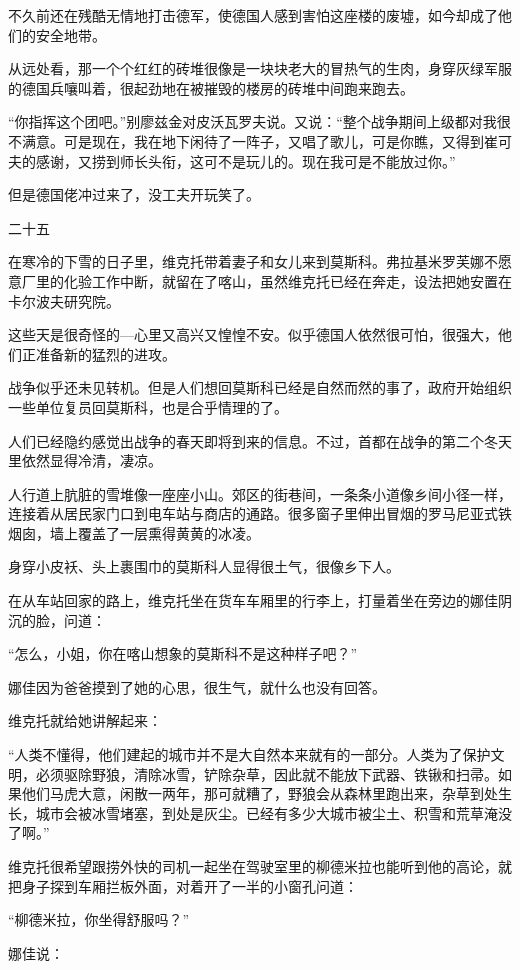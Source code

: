 不久前还在残酷无情地打击德军，使德国人感到害怕这座楼的废墟，如今却成了他们的安全地带。

从远处看，那一个个红红的砖堆很像是一块块老大的冒热气的生肉，身穿灰绿军服的德国兵嚷叫着，很起劲地在被摧毁的楼房的砖堆中间跑来跑去。

“你指挥这个团吧。”别廖兹金对皮沃瓦罗夫说。又说：“整个战争期间上级都对我很不满意。可是现在，我在地下闲待了一阵子，又唱了歌儿，可是你瞧，又得到崔可夫的感谢，又捞到师长头衔，这可不是玩儿的。现在我可是不能放过你。”

但是德国佬冲过来了，没工夫开玩笑了。

二十五

在寒冷的下雪的日子里，维克托带着妻子和女儿来到莫斯科。弗拉基米罗芙娜不愿意厂里的化验工作中断，就留在了喀山，虽然维克托已经在奔走，设法把她安置在卡尔波夫研究院。

这些天是很奇怪的—心里又高兴又惶惶不安。似乎德国人依然很可怕，很强大，他们正准备新的猛烈的进攻。

战争似乎还未见转机。但是人们想回莫斯科已经是自然而然的事了，政府开始组织一些单位复员回莫斯科，也是合乎情理的了。

人们已经隐约感觉出战争的春天即将到来的信息。不过，首都在战争的第二个冬天里依然显得冷清，凄凉。

人行道上肮脏的雪堆像一座座小山。郊区的街巷间，一条条小道像乡间小径一样，连接着从居民家门口到电车站与商店的通路。很多窗子里伸出冒烟的罗马尼亚式铁烟囱，墙上覆盖了一层熏得黄黄的冰凌。

身穿小皮袄、头上裹围巾的莫斯科人显得很土气，很像乡下人。

在从车站回家的路上，维克托坐在货车车厢里的行李上，打量着坐在旁边的娜佳阴沉的脸，问道：

“怎么，小姐，你在喀山想象的莫斯科不是这种样子吧？”

娜佳因为爸爸摸到了她的心思，很生气，就什么也没有回答。

维克托就给她讲解起来：

“人类不懂得，他们建起的城市并不是大自然本来就有的一部分。人类为了保护文明，必须驱除野狼，清除冰雪，铲除杂草，因此就不能放下武器、铁锹和扫帚。如果他们马虎大意，闲散一两年，那可就糟了，野狼会从森林里跑出来，杂草到处生长，城市会被冰雪堵塞，到处是灰尘。已经有多少大城市被尘土、积雪和荒草淹没了啊。”

维克托很希望跟捞外快的司机一起坐在驾驶室里的柳德米拉也能听到他的高论，就把身子探到车厢拦板外面，对着开了一半的小窗孔问道：

“柳德米拉，你坐得舒服吗？”

娜佳说：

